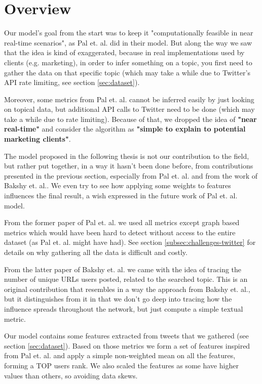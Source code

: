 \section{Overview}
\label{sec:metrics-overview}

Our model's goal from the start was to keep it "computationally feasible in near real-time scenarios", as Pal et. al. did in their model\cite{microblogs}. But along the way we saw that the idea is kind of exaggerated, because in real implementations used by clients (e.g. marketing), in order to infer something on a topic, you first need to gather the data on that specific topic (which may take a while due to Twitter's API rate limiting, see section \ref{sec:dataset}).

Moreover, some metrics from Pal et. al.\cite{microblogs} cannot be inferred easily by just looking on topical data, but additional API calls to Twitter need to be done (which may take a while due to rate limiting). Because of that, we dropped the idea of \textbf{"near real-time"} and consider the algorithm as \textbf{"simple to explain to potential marketing clients"}.

The model proposed in the following thesis is not our contribution to the field, but rather put together, in a way it hasn't been done before, from contributions presented in the previous section, especially from Pal et. al.\cite{microblogs} and from the work of Bakshy et. al.\cite{bakshy}. We even try to see how applying some weights to features influences the final result, a wish expressed in the future work of Pal et. al. model.

From the former paper of Pal et. al.\cite{microblogs} we used all metrics except graph based metrics which would have been hard to detect without access to the entire dataset (as Pal et. al. might have had). See section \ref{subsec:challenges-twitter} for details on why gathering all the data is difficult and costly.

From the latter paper of Bakshy et. al.\cite{bakshy} we came with the idea of tracing the number of unique URLs users posted, related to the searched topic. This is an original contribution that resembles in a way the approach from Bakshy et. al.\cite{bakshy}, but it distinguishes from it in that we don't go deep into tracing how the influence spreads throughout the network, but just compute a simple textual metric.

Our model contains some features extracted from tweets that we gathered (see section \ref{sec:dataset}). Based on those metrics we form a set of features inspired from Pal et. al.\cite{microblogs} and apply a simple non-weighted mean on all the features, forming a TOP users rank. We also scaled the features as some have higher values than others, so avoiding data skews.


